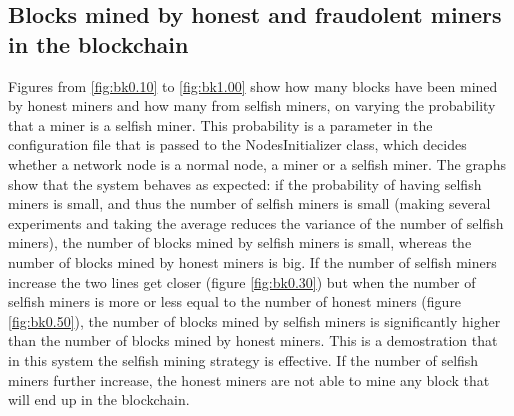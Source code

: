 \documentclass{article}
\begin{document}
\subsection{Blocks mined by honest and fraudolent miners in the blockchain} 
Figures from \ref{fig:bk0.10} to \ref{fig:bk1.00} show how many blocks have been mined by honest miners and how many from selfish miners, on varying the probability that a miner is a selfish miner. This probability is a parameter in the configuration file that is passed to the NodesInitializer class, which decides whether a network node is a normal node, a miner or a selfish miner. The graphs show that the system behaves as expected: if the probability of having selfish miners is small, and thus the number of selfish miners is small (making several experiments and taking the average reduces the variance of the number of selfish miners), the number of blocks mined by selfish miners is small, whereas the number of blocks mined by honest miners is big. If the number of selfish miners increase the two lines get closer (figure \ref{fig:bk0.30}) but when the number of selfish miners is more or less equal to the number of honest miners (figure \ref{fig:bk0.50}), the number of blocks mined by selfish miners is significantly higher than the number of blocks mined by honest miners. This is a demostration that in this system the selfish mining strategy is effective. If the number of selfish miners further increase, the honest miners are not able to mine any block that will end up in the blockchain.
\end{document}
